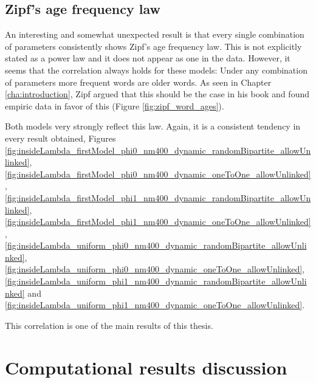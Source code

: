 \subsection{Zipf's age frequency law}
\label{sec:discussion_math_age-freq}

An interesting and somewhat unexpected result is that every single combination of parameters consistently shows Zipf's age frequency law.
This is not explicitly stated as a power law and it does not appear as one in the data.
However, it seems that the correlation always holds for these models: Under any combination of parameters more frequent words are older words.
As seen in Chapter \ref{cha:introduction}, Zipf argued that this should be the case in his book \cite{Zipf1949a} and found empiric data in favor of this (Figure \ref{fig:zipf_word_ages}).

Both models very strongly reflect this law.
Again, it is a consistent tendency in every result obtained, Figures \ref{fig:insideLambda_firstModel_phi0_nm400_dynamic_randomBipartite_allowUnlinked},  \ref{fig:insideLambda_firstModel_phi0_nm400_dynamic_oneToOne_allowUnlinked},  \ref{fig:insideLambda_firstModel_phi1_nm400_dynamic_randomBipartite_allowUnlinked},  \ref{fig:insideLambda_firstModel_phi1_nm400_dynamic_oneToOne_allowUnlinked},  \ref{fig:insideLambda_uniform_phi0_nm400_dynamic_randomBipartite_allowUnlinked},  \ref{fig:insideLambda_uniform_phi0_nm400_dynamic_oneToOne_allowUnlinked},  \ref{fig:insideLambda_uniform_phi1_nm400_dynamic_randomBipartite_allowUnlinked} and \ref{fig:insideLambda_uniform_phi1_nm400_dynamic_oneToOne_allowUnlinked}.

This correlation is one of the main results of this thesis.

\section{Computational results discussion}
\label{sec:discussion_comp}

